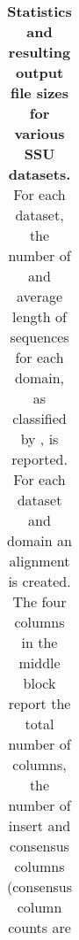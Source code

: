 \begin{table}[hb]
\begin{center}
\begin{tabular}{lllrr|rrrr|rr}
\end{tabular}
\end{center}
\caption{\textbf{Statistics and resulting output file sizes for
    various SSU datasets.} For each dataset, the number
  of and average length of sequences for each domain, as classified by
  , is reported. For each dataset and domain an
  alignment is created. The four columns in the middle block report
  the total number of columns, the
  number of insert and consensus columns (consensus column counts are
}
\end{table}
